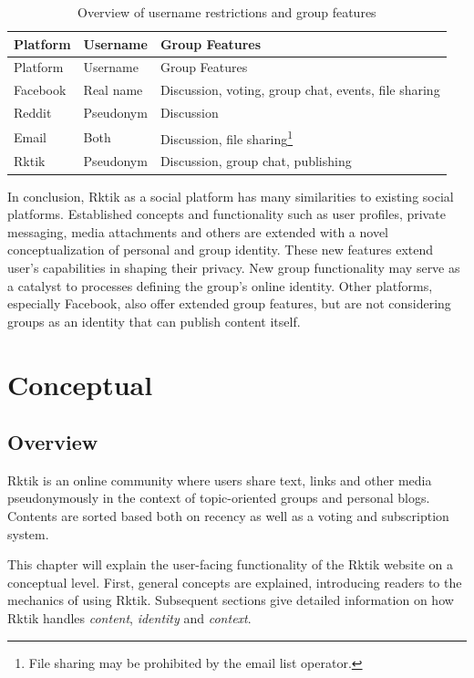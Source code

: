 \begin{longtable}[c]{@{}lll@{}}
\caption{Overview of username restrictions and group
features}\tabularnewline
\toprule
Platform & Username & Group Features\tabularnewline
\midrule
\endfirsthead
\toprule
Platform & Username & Group Features\tabularnewline
\midrule
\endhead
Facebook & Real name & Discussion, voting, group chat, events, file
sharing\tabularnewline
Reddit & Pseudonym & Discussion\tabularnewline
Email & Both & Discussion, file sharing\footnote{File sharing may be
  prohibited by the email list operator.}\tabularnewline
Rktik & Pseudonym & Discussion, group chat, publishing\tabularnewline
\bottomrule
\end{longtable}

In conclusion, Rktik as a social platform has many similarities to
existing social platforms. Established concepts and functionality such
as user profiles, private messaging, media attachments and others are
extended with a novel conceptualization of personal and group identity.
These new features extend user's capabilities in shaping their privacy.
New group functionality may serve as a catalyst to processes defining
the group's online identity. Other platforms, especially Facebook, also
offer extended group features, but are not considering groups as an
identity that can publish content itself.

\chapter{Conceptual}\label{conceptual}

\section{Overview}\label{overview}

Rktik is an online community where users share text, links and other
media pseudonymously in the context of topic-oriented groups and
personal blogs. Contents are sorted based both on recency as well as a
voting and subscription system.

This chapter will explain the user-facing functionality of the Rktik
website on a conceptual level. First, general concepts are explained,
introducing readers to the mechanics of using Rktik. Subsequent sections
give detailed information on how Rktik handles \emph{content},
\emph{identity} and \emph{context}.


